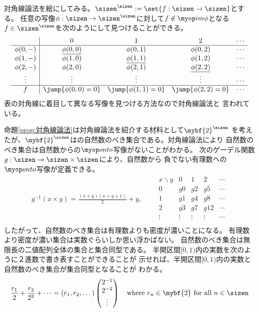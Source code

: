 	対角線論法を絵にしてみる。$\sizen^\sizen:=\set{f:\sizen\to\sizen}$とする。
	任意の写像$\phi:\sizen\to\sizen^\sizen$に対して$f\not\in\im\phi$となる
	$f\in\sizen^\sizen$を次のようにして見つけることができる。
	\begin{equation*}\begin{split}
		\begin{array}{c|cccc}
			& 0 & 1 & 2 & \cdots \\ \hline
			\phi(0,-) & \underline{\phi(0,0)} & \phi(0,1) & \phi(0,2) & \cdots \\
			\phi(1,-) & \phi(1,0) & \underline{\phi(1,1)} & \phi(1,2) & \cdots \\
			\phi(2,-) & \phi(2,0) & \phi(2,1) & \underline{\phi(2,2)} & \cdots \\
			\vdots & \vdots & \vdots & \vdots & \cdots \\ \hline
			f & \jump{\phi(0,0)=0} & \jump{\phi(1,1)=0} & \jump{\phi(2,2)=0} & \cdots \\
		\end{array}
	\end{split}\end{equation*}
	表の対角線に着目して異なる写像を見つける方法なので対角線論法と
	言われている。

	命題\ref{prop:対角線論法}は対角線論法を紹介する材料として$\mybf{2}^\sizen$
	を考えたが、$\mybf{2}^\sizen$はの自然数のべき集合である。対角線論法により
	自然数のべき集合は自然数からの$\onto$写像がないことがわかる。
	次のゲーデル関数$g:\sizen\to\sizen\times\sizen$により、自然数から
	負でない有理数への$\onto$写像が定義できる。
	\begin{equation*}\begin{split}
		g^{-1}(x\times y) = \frac{(x+y)(x+y+1)}{2} + y 
		,\qquad \begin{array}{c|cccc}
			x\backslash y & 0 & 1 & 2 & \cdots \\ \hline
			0 & g0 & g2 & g5 & \cdots \\
			1 & g1 & g4 & g8 & \cdots \\
			2 & g3 & g7 & g12 & \cdots \\
			\vdots & \vdots & \vdots & \vdots & \cdots \\
		\end{array}
	\end{split}\end{equation*}
	したがって、自然数のべき集合は有理数よりも密度が濃いことになる。
	有理数より密度が濃い集合は実数ぐらいしか思い浮かばない。
	自然数のべき集合は無限長の二値配列全体の集合と集合同型である。
	半開区間$[0,1)$内の実数を次のように２進数で書き表すことができることが
	示せれば、半開区間$[0,1)$内の実数と自然数のべき集合が集合同型となることが
	わかる。
	\begin{equation*}\begin{split}
		\frac{r_1}{2} + \frac{r_2}{2^2} + \cdots = (r_1,r_2,\dots)\begin{pmatrix}
			2^{-1} \\ 2^{-2} \\ \vdots
		\end{pmatrix}
		\quad\text{where } r_n\in\mybf{2} \text{ for all }n\in\sizen
	\end{split}\end{equation*}

